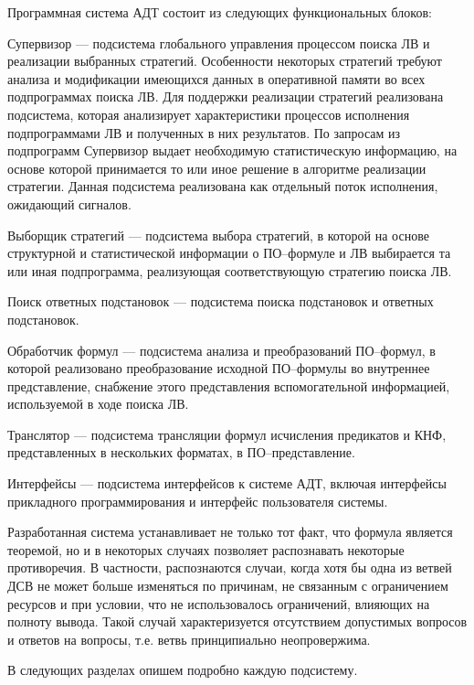 Программная система АДТ состоит из следующих функциональных блоков:
\begin{description}
  \item{Супервизор} --- подсистема глобального управления процессом поиска ЛВ и реализации выбранных стратегий. Особенности некоторых стратегий требуют анализа и модификации имеющихся данных в оперативной памяти во всех подпрограммах поиска ЛВ. Для поддержки реализации стратегий реализована подсистема, которая анализирует характеристики процессов исполнения подпрограммами ЛВ и полученных в них результатов. По запросам из подпрограмм Супервизор выдает необходимую статистическую информацию, на основе которой принимается то или иное решение в алгоритме реализации стратегии. Данная подсистема реализована как отдельный поток исполнения, ожидающий сигналов.
  \item{Выборщик стратегий} --- подсистема выбора стратегий, в которой на основе структурной и статистической информации о ПО--формуле и ЛВ выбирается та или иная подпрограмма, реализующая соответствующую стратегию поиска ЛВ.
  \item{Поиск ответных подстановок} --- подсистема поиска подстановок и ответных подстановок.
  \item{Обработчик формул} --- подсистема анализа и преобразований ПО--формул, в которой реализовано преобразование исходной ПО--формулы во внутреннее представление, снабжение этого представления вспомогательной информацией, используемой в ходе поиска ЛВ.
  \item{Транслятор} --- подсистема трансляции формул исчисления предикатов и КНФ, представленных в нескольких форматах, в ПО--представление.
  \item{Интерфейсы} --- подсистема интерфейсов к системе АДТ, включая интерфейсы прикладного программирования и интерфейс пользователя системы.
  \end{description}

Разработанная система устанавливает не только тот факт, что формула является теоремой, но и в некоторых случаях позволяет распознавать некоторые противоречия. В частности, распознаются случаи, когда хотя бы одна из ветвей ДСВ не может больше изменяться по причинам, не связанным с ограничением ресурсов и при условии, что не использовалось ограничений, влияющих на полноту вывода. Такой случай характеризуется отсутствием допустимых вопросов и ответов на вопросы, т.е. ветвь принципиально неопровержима.

В следующих разделах опишем подробно каждую подсистему.


